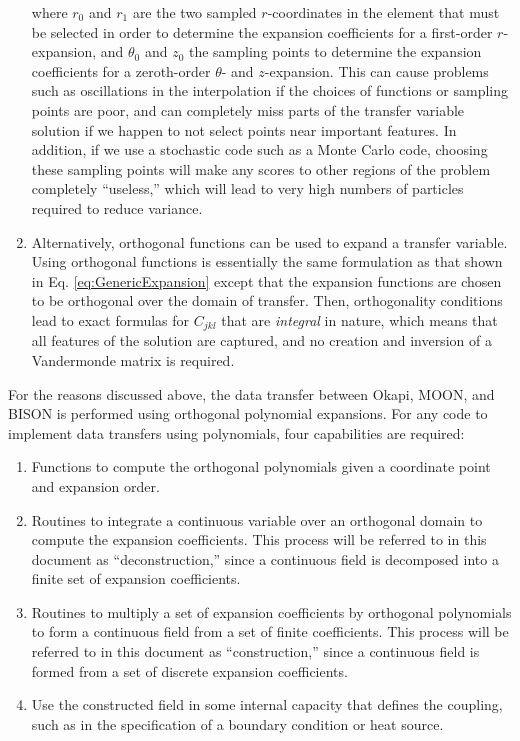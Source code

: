 \documentclass[10pt]{article}
\numberwithin{equation}{section} %
\begin{document}
\begin{enumerate}
where \(r_0\) and \(r_1\) are the two sampled \(r\)-coordinates in the element that must be selected in order to determine the expansion coefficients for a first-order \(r\)-expansion, and \(\theta_0\) and \(z_0\) the sampling points to determine the expansion coefficients for a zeroth-order \(\theta\)- and \(z\)-expansion. This can cause problems such as oscillations in the interpolation if the choices of functions or sampling points are poor, and can completely miss parts of the transfer variable solution if we happen to not select points near important features. In addition, if we use a stochastic code such as a Monte Carlo code, choosing these sampling points will make any scores to other regions of the problem completely ``useless,'' which will lead to very high numbers of particles required to reduce variance.

\item Alternatively, orthogonal functions can be used to expand a transfer variable. Using orthogonal functions is essentially the same formulation as that shown in Eq. \eqref{eq:GenericExpansion} except that the expansion functions are chosen to be orthogonal over the domain of transfer. Then, orthogonality conditions lead to exact formulas for \(C_{jkl}\) that are {\it integral} in nature, which means that all features of the solution are captured, and no creation and inversion of a Vandermonde matrix is required. 
\end{enumerate}

For the reasons discussed above, the data transfer between Okapi, MOON, and BISON is performed using orthogonal polynomial expansions. For any code to implement data transfers using polynomials, four capabilities are required:

\begin{enumerate}
\item Functions to compute the orthogonal polynomials given a coordinate point and expansion order.
\item Routines to integrate a continuous variable over an orthogonal domain to compute the expansion coefficients. This process will be referred to in this document as ``deconstruction,'' since a continuous field is decomposed into a finite set of expansion coefficients.
\item Routines to multiply a set of expansion coefficients by orthogonal polynomials to form a continuous field from a set of finite coefficients. This process will be referred to in this document as ``construction,'' since a continuous field is formed from a set of discrete expansion coefficients.
\item Use the constructed field in some internal capacity that defines the coupling, such as in the specification of a boundary condition or heat source.
\end{enumerate}
\end{document}
